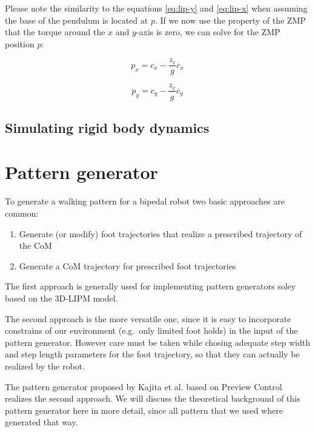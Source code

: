 \documentclass[english,ngerman]{KITreprt}
\newcommand{\clr}[2]{{\color{#1}{#2}}}
\newcommand{\todo}[1]{\marginpar{\clr{red}{#1}}}
\begin{document}
Please note the similarity to the equations \ref{eq:lip-y} and
\ref{eq:lip-x} when assuming the base of the pendulum is located at $p$.
If we now use the property of the ZMP that the torque around the $x$ and
$y$-axis is zero, we can solve for the ZMP position $p$:

\begin{equation} \label{eq:zmp-x}
p_x = c_x - \frac{z_c}{g} \ddot{c_x}
\end{equation}

\begin{equation} \label{eq:zmp-y}
p_y = c_y - \frac{z_c}{g} \ddot{c_y}
\end{equation}

\todo{Maybe describe the full-body methode to compute the ZMP}

\section{Simulating rigid body
dynamics}\label{simulating-rigid-body-dynamics}

\todo{short introduction how that works and some problems with the approach}

\chapter{Pattern generator}\label{pattern-generator}

To generate a walking pattern for a bipedal robot two basic approaches
are common:

\begin{enumerate}
\def\labelenumi{\arabic{enumi}.}
\item
  Generate (or modify) foot trajectories that realize a prescribed
  trajectory of the CoM
\item
  Generate a CoM trajectory for prescribed foot trajectories
\end{enumerate}

The first approach is generally used for implementing pattern generators
soley based on the 3D-LIPM model. \todo{citation needed}

The second approach is the more versatile one, since it is easy to
incorporate constrains of our environment (e.g.~only limited foot holds)
in the input of the pattern generator. However care must be taken while
chosing adequate step width and step length parameters for the foot
trajectory, so that they can actually be realized by the robot.

The pattern generator proposed by Kajita et al. \todo{add citation}
based on Preview Control realizes the second approach. We will discuss
the theoretical background of this pattern generator here in more
detail, since all pattern that we used where generated that way.
\end{document}
